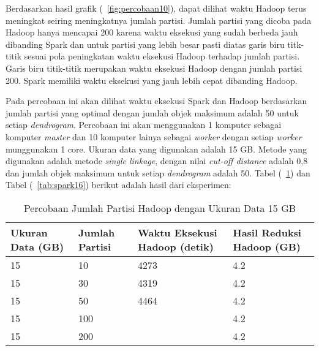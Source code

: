 Berdasarkan hasil grafik (~\ref{fig:percobaan10}), dapat dilihat waktu Hadoop terus meningkat seiring meningkatnya jumlah partisi. Jumlah partisi yang dicoba pada Hadoop hanya mencapai 200 karena waktu eksekusi yang sudah berbeda jauh dibanding Spark dan untuk partisi yang lebih besar pasti diatas garis biru titk-titik sesuai pola peningkatan waktu eksekusi Hadoop terhadap jumlah partisi. Garis biru titik-titik merupakan waktu eksekusi Hadoop dengan jumlah partisi 200. Spark memiliki waktu eksekusi yang jauh lebih cepat dibanding Hadoop.  





Pada percobaan ini akan dilihat waktu eksekusi Spark dan Hadoop berdasarkan jumlah partisi yang optimal dengan jumlah objek maksimum adalah 50 untuk setiap \textit{dendrogram}. Percobaan ini akan menggunakan 1 komputer sebagai komputer \textit{master} dan 10 komputer lainya sebagai \textit{worker} dengan setiap \textit{worker} munggunakan 1 core. Ukuran data yang digunakan adalah 15 GB. Metode yang digunakan adalah metode \textit{single linkage}, dengan nilai \textit{cut-off distance} adalah 0,8 dan jumlah objek maksimum untuk setiap \textit{dendrogram} adalah 50. Tabel (~\ref{tab:spark15}) dan Tabel (~\ref{tab:spark16}) berikut adalah hasil dari eksperimen:





\begin{table}[H] 
	\centering 
	\caption{Percobaan Jumlah Partisi Hadoop dengan Ukuran Data 15 GB}
	\label{tab:spark15}
	\begin{tabular}{|p{3cm}|p{3cm}|p{4cm}|p{4cm}|}
\hline
Ukuran Data (GB) & Jumlah Partisi &  Waktu Eksekusi Hadoop (detik) & Hasil Reduksi Hadoop (GB)\\
\hline
15 & 10 & 4273  & 4.2  \\
\hline
15 & 30 & 4319  & 4.2  \\
\hline
15 & 50 & 4464  & 4.2  \\
\hline
15 & 100 &   & 4.2  \\
\hline
15 & 200 &   & 4.2  \\
\hline


\hline

	\end{tabular} 
\end{table}




